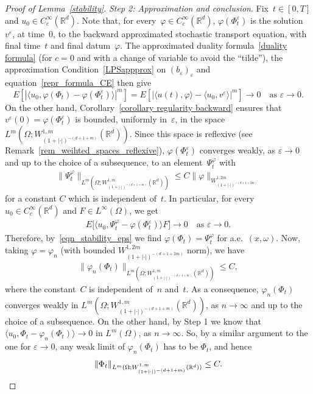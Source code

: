 \documentclass[a4paper,10pt]{article}
\newcommand\1{\mathbbm{1}}
\newcommand{\lan}{\langle}
\newcommand{\ran}{\rangle}
\newcommand{\eps}{\varepsilon}
\numberwithin{equation}{section}
\begin{document}
\begin{proof}[Proof of Lemma~\ref{stability}]
\emph{Step 2: Approximation and conclusion}. Fix~$t \in [0,T]$ and $u_0 \in C^\infty_c(\mathbb{R}^d)$. Note that, for every~$\varphi \in C^\infty_c(\mathbb{R}^d)$, $\varphi(\Phi^\eps_t)$ is the solution $v^\eps$, at time~$0$, to the backward approximated stochastic transport equation, with final time~$t$ and final datum~$\varphi$. The approximated duality formula~\eqref{duality formula} (for $c=0$ and with a change of variable to avoid the ``tilde''), the approximation Condition~\ref{LPSappprox} on $(b_\eps)_\eps$ and equation~\eqref{repr_formula_CE} then give
\begin{equation}
\label{eqn_stability_eps}
E\left[\left|\lan u_0,\varphi(\Phi_t)-\varphi(\Phi^\eps_t)\ran \right|^m\right] = E\left[\left| \lan u(t),\varphi\ran -\lan u_0,v^\eps\ran \right|^m\right] \rightarrow 0 \quad \text{as } \eps \to 0.
\end{equation}
On the other hand, Corollary~\ref{corollary regularity backward} ensures that $v^\eps(0) = \varphi(\Phi^\eps_t)$ is bounded, uniformly in~$\eps$, in the space $L^m(\Omega;W^{1,m}_{(1+|\cdot|)^{-(d+1+m)}}(\mathbb{R}^d))$. Since this space is reflexive (see Remark~\ref{rem_weihted_spaces_reflexive}), $\varphi(\Phi^\eps_t)$ converges weakly, as $\eps\rightarrow0$ and up to the choice of a subsequence, to an element~$\Psi^\varphi_t$ with
\begin{align*}
\|\Psi^\varphi_t\|_{L^m(\Omega;W^{1,m}_{(1+|\cdot|)^{-(d+1+m)}}(\mathbb{R}^d))} \le C\|\varphi\|_{W^{1,2m}_{(1+|\cdot|)^{-(d+1+2m)}}}
\end{align*}
for a constant $C$ which is independent of~$t$. In particular, for every $u_0 \in C^\infty_c(\mathbb{R}^d)$ and $F \in L^\infty(\Omega)$, we get
\begin{align*}
E\big[\lan u_0,\Psi^\varphi_t-\varphi(\Phi^\eps_t)\ran F\big]\rightarrow 0 \quad \text{as } \eps \to 0.
\end{align*}
Therefore, by~\eqref{eqn_stability_eps} we find $\varphi(\Phi_t)=\Psi^\varphi_t$ for a.e.~$(x,\omega)$. Now, taking $\varphi=\varphi_n$ (with bounded $W^{1,2m}_{(1+|\cdot|)^{-(d+1+2m)}}$ norm), we have
\begin{align*}
\|\varphi_n(\Phi_t)\|_{L^m(\Omega;W^{1,m}_{(1+|\cdot|)^{-(d+1+m)}}(\mathbb{R}^d))} \le C,
\end{align*}
where the constant~$C$ is independent of~$n$ and~$t$. As a consequence, $\varphi_n(\Phi_t)$ converges weakly in $L^m(\Omega;W^{1,m}_{(1+|\cdot|)^{-(d+1+m)}}(\mathbb{R}^d))$, as $n\rightarrow\infty$ and up to the choice of a subsequence. On the other hand, by Step 1 we know that $\lan u_0,\Phi_t-\varphi_n(\Phi_t)\ran \to 0$ in $L^m(\Omega)$, as $n \to \infty$. So, by a similar argument to the one for $\eps\rightarrow0$, any weak limit of $\varphi_n(\Phi_t)$ has to be $\Phi_t$, and hence
\begin{equation*}
\|\Phi_t\|_{L^m(\Omega;W^{1,m}_{(1+|\cdot|)^{-(d+1+m)}}(\mathbb{R}^d))} \le C. \qedhere
\end{equation*}
\end{proof}
\end{document}
